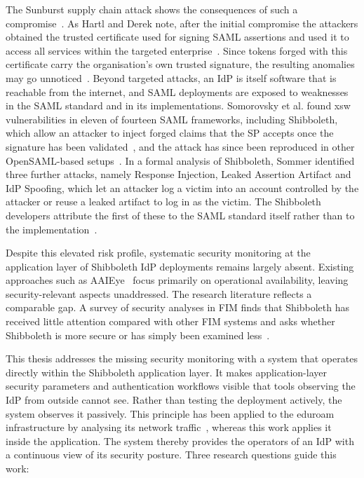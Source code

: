 \documentclass[../main.tex]{subfiles}
\begin{document}
The Sunburst supply chain attack shows the consequences of such a compromise~\cite{FireEyeSSC}. 
As Hartl and Derek note, after the initial compromise the attackers obtained the 
trusted certificate used for signing SAML assertions and used it to access all 
services within the targeted enterprise~\cite{FormalSecAnalysisSAML}. 
Since tokens forged with this certificate carry the organisation's own trusted signature, 
the resulting anomalies may go unnoticed~\cite{MicrosoftBlogSSC}. 
Beyond targeted attacks, an IdP is itself software that is reachable from the internet, and SAML 
deployments are exposed to weaknesses in the SAML standard and in its implementations. 
Somorovsky et al. found \gls{xsw} vulnerabilities in eleven of fourteen SAML frameworks, including 
Shibboleth, which allow an attacker to inject forged claims that the SP accepts once the signature 
has been validated~\cite{BreakingSAML}, and the attack has since been reproduced in other 
OpenSAML-based setups~\cite{VulnerSAMLCloud}. 
In a formal analysis of Shibboleth, Sommer identified three further attacks, namely Response 
Injection, Leaked Assertion Artifact and IdP Spoofing, which let an attacker log a victim into an 
account controlled by the attacker or reuse a leaked artifact to log in as the victim. 
The Shibboleth developers attribute the first of these to the SAML standard itself rather than to 
the implementation~\cite{SecAnalysisSSO}. 

Despite this elevated risk profile, systematic security monitoring at the application layer of Shibboleth 
IdP deployments remains largely absent. 
Existing approaches such as AAIEye~\cite{MonitoringAAI} focus primarily on operational availability, 
leaving security-relevant aspects unaddressed. 
The research literature reflects a comparable gap. 
A survey of security analyses in FIM finds that Shibboleth has received little attention compared 
with other FIM systems and asks whether Shibboleth is more secure or has simply been 
examined less~\cite{FIMSurvey}. 

This thesis addresses the missing security monitoring with a system that operates directly within the 
Shibboleth application layer. 
It makes application-layer security parameters and authentication workflows visible that tools observing 
the IdP from outside cannot see. 
Rather than testing the deployment actively, the system observes it passively. 
This principle has been applied to the eduroam infrastructure by analysing its network 
traffic~\cite{EAPeduroam}, whereas this work applies it inside the application. 
The system thereby provides the operators of an IdP with a continuous view of its security posture. 
Three research questions guide this work:
\end{document}
